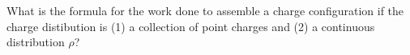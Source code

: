 

\vspace*{\fill}
\centering

What is the formula for the work done to assemble a charge configuration if the charge distibution is (1) a collection of point charges and (2) a continuous distribution $\rho$?

\centering
\vspace*{\fill}

